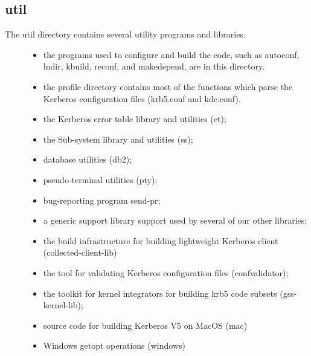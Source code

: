 \documentclass[letterpaper,10pt,english]{sphinxmanual}
\begin{document}
\subsection{util}
\label{\detokenize{build/directory_org:util}}\label{\detokenize{build/directory_org:id2}}\begin{description}
\item[{The util directory contains several utility programs and libraries.}] \leavevmode\begin{itemize}
\item {} 
the programs used to configure and build the code, such as
autoconf, lndir, kbuild, reconf, and makedepend, are in this
directory.

\item {} 
the profile directory contains most of the functions which parse
the Kerberos configuration files (krb5.conf and kdc.conf).

\item {} 
the Kerberos error table library and utilities (et);

\item {} 
the Sub-system library and utilities (ss);

\item {} 
database utilities (db2);

\item {} 
pseudo-terminal utilities (pty);

\item {} 
bug-reporting program send-pr;

\item {} 
a generic support library support used by several of our other
libraries;

\item {} 
the build infrastructure for building lightweight Kerberos client
(collected-client-lib)

\item {} 
the tool for validating Kerberos configuration files
(confvalidator);

\item {} 
the toolkit for kernel integrators for building krb5 code subsets
(gss-kernel-lib);

\item {} 
source code for building Kerberos V5 on MacOS (mac)

\item {} 
Windows getopt operations (windows)

\end{itemize}

\end{description}
\end{document}
